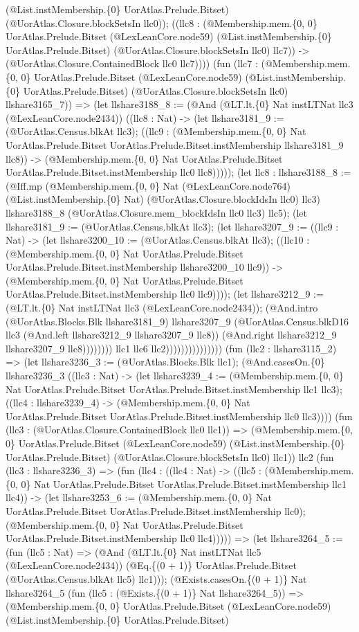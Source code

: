\documentclass[11pt]{article}
\begin{document}
(@List.instMembership.\{0\} UorAtlas.Prelude.Bitset) (@UorAtlas.Closure.blockSetsIn llc0)); ((llc8 : (@Membership.mem.\{0, 0\} UorAtlas.Prelude.Bitset (@LexLeanCore.node59) (@List.instMembership.\{0\} UorAtlas.Prelude.Bitset) (@UorAtlas.Closure.blockSetsIn llc0) llc7)) -> (@UorAtlas.Closure.ContainedBlock llc0 llc7)))) (fun (llc7 : (@Membership.mem.\{0, 0\} UorAtlas.Prelude.Bitset (@LexLeanCore.node59) (@List.instMembership.\{0\} UorAtlas.Prelude.Bitset) (@UorAtlas.Closure.blockSetsIn llc0) llshare3165\_7)) => (let llshare3188\_8 := (@And (@LT.lt.\{0\} Nat instLTNat llc3 (@LexLeanCore.node2434)) ((llc8 : Nat) -> (let llshare3181\_9 := (@UorAtlas.Census.blkAt llc3); ((llc9 : (@Membership.mem.\{0, 0\} Nat UorAtlas.Prelude.Bitset UorAtlas.Prelude.Bitset.instMembership llshare3181\_9 llc8)) -> (@Membership.mem.\{0, 0\} Nat UorAtlas.Prelude.Bitset UorAtlas.Prelude.Bitset.instMembership llc0 llc8))))); (let llc8 : llshare3188\_8 := (@Iff.mp (@Membership.mem.\{0, 0\} Nat (@LexLeanCore.node764) (@List.instMembership.\{0\} Nat) (@UorAtlas.Closure.blockIdsIn llc0) llc3) llshare3188\_8 (@UorAtlas.Closure.mem\_blockIdsIn llc0 llc3) llc5); (let llshare3181\_9 := (@UorAtlas.Census.blkAt llc3); (let llshare3207\_9 := ((llc9 : Nat) -> (let llshare3200\_10 := (@UorAtlas.Census.blkAt llc3); ((llc10 : (@Membership.mem.\{0, 0\} Nat UorAtlas.Prelude.Bitset UorAtlas.Prelude.Bitset.instMembership llshare3200\_10 llc9)) -> (@Membership.mem.\{0, 0\} Nat UorAtlas.Prelude.Bitset UorAtlas.Prelude.Bitset.instMembership llc0 llc9)))); (let llshare3212\_9 := (@LT.lt.\{0\} Nat instLTNat llc3 (@LexLeanCore.node2434)); (@And.intro (@UorAtlas.Blocks.Blk llshare3181\_9) llshare3207\_9 (@UorAtlas.Census.blkD16 llc3 (@And.left llshare3212\_9 llshare3207\_9 llc8)) (@And.right llshare3212\_9 llshare3207\_9 llc8)))))))) llc1 llc6 llc2))))))))))))))) (fun (llc2 : llshare3115\_2) => (let llshare3236\_3 := (@UorAtlas.Blocks.Blk llc1); (@And.casesOn.\{0\} llshare3236\_3 ((llc3 : Nat) -> (let llshare3239\_4 := (@Membership.mem.\{0, 0\} Nat UorAtlas.Prelude.Bitset UorAtlas.Prelude.Bitset.instMembership llc1 llc3); ((llc4 : llshare3239\_4) -> (@Membership.mem.\{0, 0\} Nat UorAtlas.Prelude.Bitset UorAtlas.Prelude.Bitset.instMembership llc0 llc3)))) (fun (llc3 : (@UorAtlas.Closure.ContainedBlock llc0 llc1)) => (@Membership.mem.\{0, 0\} UorAtlas.Prelude.Bitset (@LexLeanCore.node59) (@List.instMembership.\{0\} UorAtlas.Prelude.Bitset) (@UorAtlas.Closure.blockSetsIn llc0) llc1)) llc2 (fun (llc3 : llshare3236\_3) => (fun (llc4 : ((llc4 : Nat) -> ((llc5 : (@Membership.mem.\{0, 0\} Nat UorAtlas.Prelude.Bitset UorAtlas.Prelude.Bitset.instMembership llc1 llc4)) -> (let llshare3253\_6 := (@Membership.mem.\{0, 0\} Nat UorAtlas.Prelude.Bitset UorAtlas.Prelude.Bitset.instMembership llc0); (@Membership.mem.\{0, 0\} Nat UorAtlas.Prelude.Bitset UorAtlas.Prelude.Bitset.instMembership llc0 llc4))))) => (let llshare3264\_5 := (fun (llc5 : Nat) => (@And (@LT.lt.\{0\} Nat instLTNat llc5 (@LexLeanCore.node2434)) (@Eq.\{(0 + 1)\} UorAtlas.Prelude.Bitset (@UorAtlas.Census.blkAt llc5) llc1))); (@Exists.casesOn.\{(0 + 1)\} Nat llshare3264\_5 (fun (llc5 : (@Exists.\{(0 + 1)\} Nat llshare3264\_5)) => (@Membership.mem.\{0, 0\} UorAtlas.Prelude.Bitset (@LexLeanCore.node59) (@List.instMembership.\{0\} UorAtlas.Prelude.Bitset) 
\end{document}
